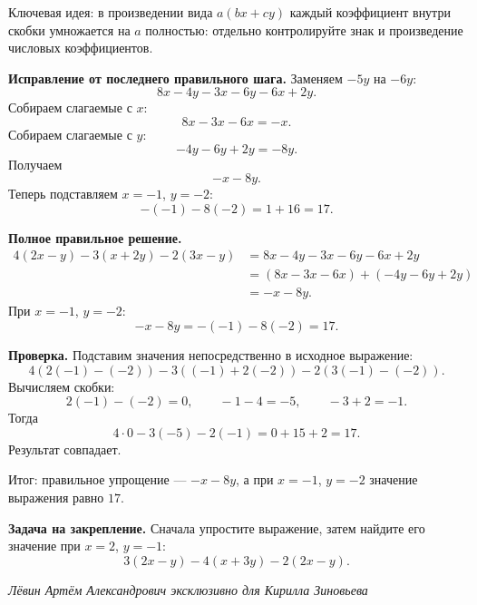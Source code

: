 \documentclass[12pt,a4paper]{article}
\begin{document}
\textcolor{blue!60!black}{Ключевая идея:} в произведении вида $a(bx+cy)$ каждый коэффициент внутри скобки умножается на $a$ полностью: отдельно контролируйте знак и произведение числовых коэффициентов.

\textbf{Исправление от последнего правильного шага.}
Заменяем $-5y$ на $-6y$:
\[
8x-4y-3x-6y-6x+2y.
\]
Собираем слагаемые с $x$:
\[
8x-3x-6x=-x.
\]
Собираем слагаемые с $y$:
\[
-4y-6y+2y=-8y.
\]
Получаем
\[
-x-8y.
\]
Теперь подставляем $x=-1$, $y=-2$:
\[
-(-1)-8(-2)=1+16=17.
\]

\textbf{Полное правильное решение.}
\[
\begin{aligned}
4(2x-y)-3(x+2y)-2(3x-y)
&=8x-4y-3x-6y-6x+2y\\
&=(8x-3x-6x)+(-4y-6y+2y)\\
&=-x-8y.
\end{aligned}
\]
При $x=-1$, $y=-2$:
\[
-x-8y=-(-1)-8(-2)=17.
\]

\textbf{Проверка.}
Подставим значения непосредственно в исходное выражение:
\[
4(2(-1)-(-2))-3((-1)+2(-2))-2(3(-1)-(-2)).
\]
Вычисляем скобки:
\[
2(-1)-(-2)=0,
\qquad
-1-4=-5,
\qquad
-3+2=-1.
\]
Тогда
\[
4\cdot 0-3(-5)-2(-1)=0+15+2=17.
\]
Результат совпадает.

\textcolor{teal!60!black}{Итог:} правильное упрощение --- $-x-8y$, а при $x=-1$, $y=-2$ значение выражения равно $17$.

\textbf{Задача на закрепление.}
Сначала упростите выражение, затем найдите его значение при $x=2$, $y=-1$:
\[
3(2x-y)-4(x+3y)-2(2x-y).
\]

\vfill
\begin{center}
\textit{Лёвин Артём Александрович эксклюзивно для Кирилла Зиновьева}
\end{center}
\end{document}
